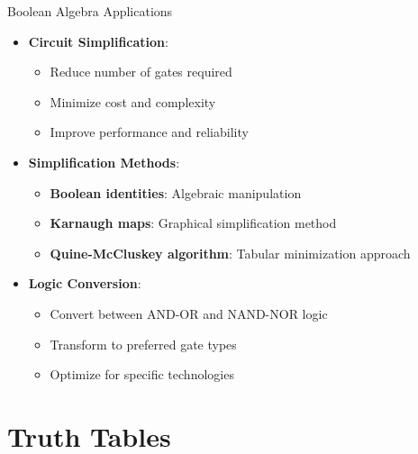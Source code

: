 \documentclass[aspectratio=169,11pt]{beamer}
\newcommand{\concept}[1]{\textbf{\color{accentcolor}#1}}
\begin{document}
\begin{frame}{Boolean Algebra Applications}
\begin{itemize}
\item \concept{Circuit Simplification}:
\begin{itemize}
\item Reduce number of gates required
\item Minimize cost and complexity
\item Improve performance and reliability
\end{itemize}
\vspace{0.5cm}
\item \concept{Simplification Methods}:
\begin{itemize}
\item \textbf{Boolean identities}: Algebraic manipulation
\item \textbf{Karnaugh maps}: Graphical simplification method
\item \textbf{Quine-McCluskey algorithm}: Tabular minimization approach
\end{itemize}
\vspace{0.5cm}
\item \concept{Logic Conversion}:
\begin{itemize}
\item Convert between AND-OR and NAND-NOR logic
\item Transform to preferred gate types
\item Optimize for specific technologies
\end{itemize}
\end{itemize}
\end{frame}

\section{Truth Tables}
\end{document}
